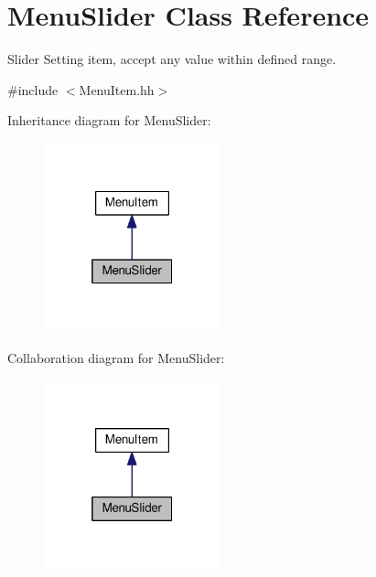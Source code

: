 \hypertarget{classMenuSlider}{}\section{Menu\+Slider Class Reference}
\label{classMenuSlider}


Slider Setting item, accept any value within defined range.  




{\ttfamily \#include $<$Menu\+Item.\+hh$>$}



Inheritance diagram for Menu\+Slider\+:
\nopagebreak
\begin{figure}[H]
\begin{center}
\leavevmode
\includegraphics[width=145pt]{classMenuSlider__inherit__graph}
\end{center}
\end{figure}


Collaboration diagram for Menu\+Slider\+:
\nopagebreak
\begin{figure}[H]
\begin{center}
\leavevmode
\includegraphics[width=145pt]{classMenuSlider__coll__graph}
\end{center}
\end{figure}
